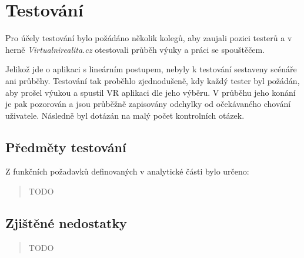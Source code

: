 \chapter{Testování}\label{testovuxe1nuxed}

Pro účely testování bylo požádáno několik kolegů, aby zaujali pozici
testerů a v herně \emph{Virtualnirealita.cz} otestovali průběh výuky a
práci se spouštěčem.

Jelikož jde o aplikaci s lineárním postupem, nebyly k testování
sestaveny scénáře ani průběhy. Testování tak proběhlo zjednodušeně, kdy
každý tester byl požádán, aby prošel výukou a spustil VR aplikaci dle
jeho výběru. V průběhu jeho konání je pak pozorován a jsou průběžně
zapisovány odchylky od očekávaného chování uživatele. Následně byl
dotázán na malý počet kontrolních otázek.

\section{Předměty testování}\label{pux159edmux11bty-testovuxe1nuxed}

Z funkčních požadavků definovaných v analytické části bylo určeno:

\begin{quote}
TODO
\end{quote}

\section{Zjištěné nedostatky}\label{zjiux161tux11bnuxe9-nedostatky}

\begin{quote}
TODO
\end{quote}
